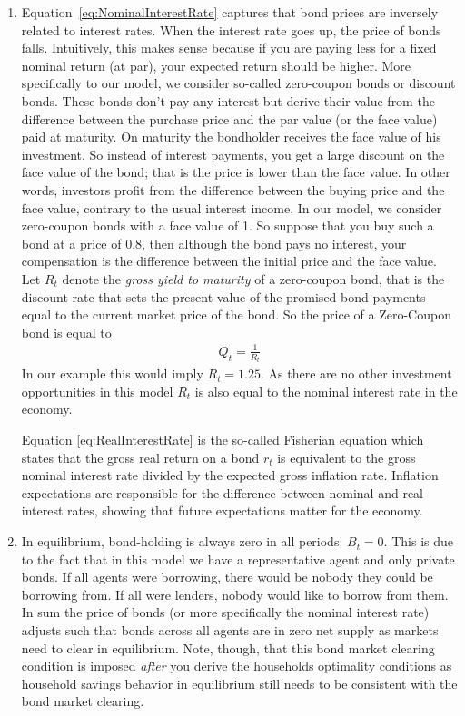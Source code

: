 \begin{enumerate}
\item Equation~\eqref{eq:NominalInterestRate} captures that bond prices are inversely related to interest rates.
When the interest rate goes up, the price of bonds falls.
Intuitively, this makes sense because if you are paying less for a fixed nominal return (at par),
  your expected return should be higher.
More specifically to our model, we consider so-called zero-coupon bonds or discount bonds.
These bonds don't pay any interest but derive their value from the difference between the purchase price and the par value (or the face value) paid at maturity.
On maturity the bondholder receives the face value of his investment.
So instead of interest payments, you get a large discount on the face value of the bond; that is the price is lower than the face value.
In other words, investors profit from the difference between the buying price and the face value, contrary to the usual interest income.
In our model, we consider zero-coupon bonds with a face value of 1.
So suppose that you buy such a bond at a price of 0.8, then although the bond pays no interest,
  your compensation is the difference between the initial price and the face value.
Let \(R_t\) denote the \emph{gross yield to maturity} of a zero-coupon bond,
  that is the discount rate that sets the present value of the promised bond payments equal to the current market price of the bond.
So the price of a Zero-Coupon bond is equal to
\begin{align*}
Q_t = \frac{1}{R_t}
\end{align*}
In our example this would imply \(R_t=1.25\).
As there are no other investment opportunities in this model \(R_t\) is also equal to the nominal interest rate in the economy.
	
Equation \eqref{eq:RealInterestRate} is the so-called Fisherian equation
  which states that the gross real return on a bond \(r_t\) is equivalent to the gross nominal interest rate divided by the expected gross inflation rate.
Inflation expectations are responsible for the difference between nominal and real interest rates, showing that future expectations matter for the economy.

\item In equilibrium, bond-holding is always zero in all periods: \(B_t=0\).
This is due to the fact that in this model we have a representative agent and only private bonds.
If all agents were borrowing, there would be nobody they could be borrowing from.
If all were lenders, nobody would like to borrow from them.
In sum the price of bonds (or more specifically the nominal interest rate) adjusts such
  that bonds across all agents are in zero net supply as markets need to clear in equilibrium.
Note, though, that this bond market clearing condition is imposed \emph{after} you derive the households optimality conditions
  as household savings behavior in equilibrium still needs to be consistent with the bond market clearing.


\end{enumerate}
